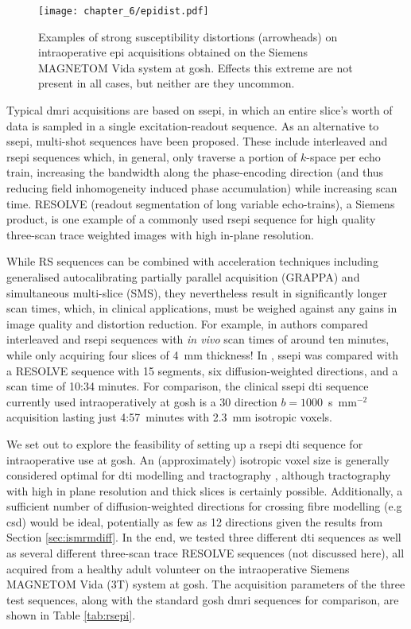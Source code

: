 \begin{figure}[h!]
  \texttt{[image: chapter\_6/epidist.pdf]}
  \caption[EPI distortion artefacts]{Examples of strong susceptibility distortions (arrowheads) on intraoperative \gls{epi} acquisitions obtained on the Siemens MAGNETOM Vida system at \gls{gosh}. Effects this extreme are not present in all cases, but neither are they uncommon.}
  \label{fig:epi}
\end{figure}

Typical \gls{dmri} acquisitions are based on \gls{ssepi}, in which an entire slice's worth of data is sampled in a single excitation-readout sequence.
As an alternative to \gls{ssepi}, multi-shot sequences have been proposed.
These include interleaved and \gls{rsepi} sequences which, in general, only traverse a portion of $k$-space per echo train, increasing the bandwidth along the phase-encoding direction (and thus reducing field inhomogeneity induced phase accumulation) while increasing scan time\autocite{Wang2018}.
RESOLVE (readout segmentation of long variable echo-trains), a Siemens product, is one example of a commonly used \gls{rsepi} sequence for high quality three-scan trace weighted images with high in-plane resolution.

While RS sequences can be combined with acceleration techniques including generalised autocalibrating partially parallel acquisition (GRAPPA) and simultaneous multi-slice (SMS), they nevertheless result in significantly longer scan times, which, in clinical applications, must be weighed against any gains in image quality and distortion reduction.
For example, in \textcite{Wang2018} authors compared interleaved and \gls{rsepi} sequences with \textit{in vivo} scan times of around ten minutes, while only acquiring four slices of 4~mm thickness!
In \textcite{Elliott2020}, \gls{ssepi} was compared with a RESOLVE sequence with 15 segments, six diffusion-weighted directions, and a scan time of 10:34 minutes.
For comparison, the clinical \gls{ssepi} \gls{dti} sequence currently used intraoperatively at \gls{gosh} is a 30 direction $b=1000$~s~mm$^{-2}$ acquisition lasting just 4:57~minutes with 2.3~mm isotropic voxels.

We set out to explore the feasibility of setting up a \gls{rsepi} \gls{dti} sequence for intraoperative use at \gls{gosh}.
An (approximately) isotropic voxel size is generally considered optimal for \gls{dti} modelling and tractography \autocite{Vos2011, Neher2013}, although tractography with high in plane resolution and thick slices is certainly possible.
Additionally, a sufficient number of diffusion-weighted directions for crossing fibre modelling (e.g \gls{csd}) would be ideal, potentially as few as 12 directions given the results from Section \ref{sec:ismrmdiff}.
In the end, we tested three different \gls{dti} sequences as well as several different three-scan trace RESOLVE sequences (not discussed here), all acquired from a healthy adult volunteer on the intraoperative Siemens MAGNETOM Vida (3T) system at \gls{gosh}.
The acquisition parameters of the three test sequences, along with the standard \gls{gosh} \gls{dmri} sequences for comparison, are shown in Table \ref{tab:rsepi}.


